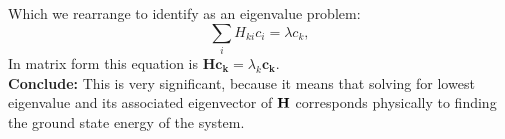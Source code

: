 \documentclass{article}[11pt]
\newcommand{\la}{\lambda}    %
\begin{document}
Which we rearrange to identify as an eigenvalue problem:
\begin{equation}
   \sum\limits_i
      H_{ki}
      c_i
= 
    \la
    c_k, 
\end{equation}
In matrix form this equation is $\mathbf{H} \mathbf{c_k} = \la_k \mathbf{c_k}$. \vspace{0.2cm} \\
{\bf Conclude:}  This is very significant, because it means that solving for lowest eigenvalue and its associated eigenvector of $\bf{H}$ corresponds physically to finding the ground state energy of the system.
\end{document}
